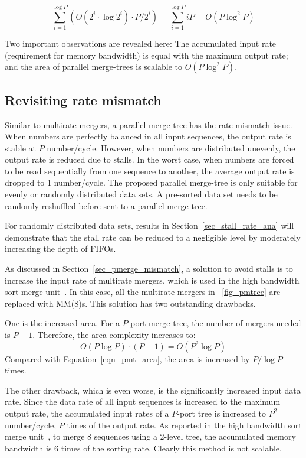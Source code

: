 \documentclass[10pt, conference]{IEEEtran}
\begin{document}
\begin{equation}\label{eqn_pmt_area}
\sum\limits_{i = 1}^{\log P} (O(2^i \cdot \log 2^i) \cdot P/2^i) = \sum\limits_{i = 1}^{\log P} iP = O(P\log ^2P)
\end{equation}

Two important observations are revealed here:
The accumulated input rate (requirement for memory bandwidth) is equal with the maximum output rate;
and the area of parallel merge-trees is scalable to $O(P\log ^2P)$.

\subsection{Revisiting rate mismatch}\label{sec_pmt_mismatch}

Similar to multirate mergers, a parallel merge-tree has the rate mismatch issue.
When numbers are perfectly balanced in all input sequences, the output rate is stable at $P$ number/cycle.
However, when numbers are distributed unevenly, the output rate is reduced due to stalls.
In the worst case, when numbers are forced to be read sequentially from one sequence to another, the average output rate is dropped to 1 number/cycle.
The proposed parallel merge-tree is only suitable for evenly or randomly distributed data sets.
A pre-sorted data set needs to be randomly reshuffled before sent to a parallel merge-tree.

For randomly distributed data sets, results in Section~\ref{sec_stall_rate_ana} will demonstrate
that the stall rate can be reduced to a negligible level by moderately increasing the depth of FIFOs.

As discussed in Section~\ref{sec_pmerge_mismatch}, a solution to avoid stalls is to increase the input rate of multirate mergers,
which is used in the high bandwidth sort merge unit~\cite{Casper2014}.
In this case, all the multirate mergers in \figurename~\ref{fig_pmtree} are replaced with MM(8)s.
This solution has two outstanding drawbacks.

One is the increased area. For a $P$-port merge-tree, the number of mergers needed is $P-1$.
Therefore, the area complexity increases to:
\begin{equation}
O(P \log P) \cdot (P-1) = O(P^2 \log P)
\end{equation}
Compared with Equation~\ref{eqn_pmt_area}, the area is increased by $P / \log P$ times.

The other drawback, which is even worse, is the significantly increased input data rate.
Since the data rate of all input sequences is increased to the maximum output rate,
the accumulated input rates of a $P$-port tree is increased to $P^2$ number/cycle, $P$ times of the output rate.
As reported in the high bandwidth sort merge unit~\cite{Casper2014}, to merge 8 sequences using a 2-level tree,
the accumulated memory bandwidth is 6 times of the sorting rate. Clearly this method is not scalable.
\end{document}
